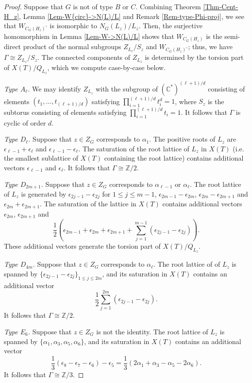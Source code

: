 \documentclass[11pt,oneside,dvipsnames]{amsart}
\theoremstyle{plain}
\theoremstyle{definition}
\theoremstyle{named}
\begin{document}
\begin{proof}
Suppose that $G$ is not of type $B$ or $C$. Combining Theorem \ref{Thm-Cent-H_z},  Lemma \ref{Lem-W{circ}->N(L)/L} and Remark \ref{Rem-type-Phi-proj}, we see that $W_{C_G(H_z)^{\circ}}$ is isomorphic to $N_G(L_z)/L_z$. Then, the surjective homomorphism in Lemma \ref{Lem-W->N(L)/L} shows that $W_{C_G(H_z)}$ is the semi-direct product of the normal subgroups $Z_{L_z}/S_z$ and $W_{C_G(H_z)^{\circ}}$; thus, we have $\Gamma\cong Z_{L_z}/S_z$. The connected components of $Z_{L_z}$ is determined by the torsion part of $X(T)/Q_{L_z}$, which we compute case-by-case below. 

\textit{Type $A_{\ell}$.} We may identify $Z_{L_z}$ with the subgroup of $(\mathbb{C}^{\ast})^{(\ell+1)/d}$ consisting of elements $(t_1,\ldots,t_{(\ell+1)/d})$ satisfying $\prod_{i=1}^{(\ell+1)/d}t_i^d=1$, where $S_z$ is the subtorus consisting of elements satisfying $\prod_{i=1}^{(\ell+1)/d}t_i=1$. It follows that $\Gamma$ is cyclic of order $d$.

\textit{Type $D_{\ell}$.} Suppose that $z\in Z_G$ corresponds to $\alpha_1$. The positive roots of $L_z$ are $\epsilon_{\ell-1}+\epsilon_{\ell}$ and $\epsilon_{\ell-1}-\epsilon_{\ell}$. The saturation of the root lattice of $L_z$ in $X(T)$ (i.e. the smallest sublattice of $X(T)$ containing the root lattice) contains additional vectors $\epsilon_{\ell-1}$ and $\epsilon_{\ell}$. It follows that $\Gamma\cong\mathbb{Z}/2$.

\textit{Type $D_{2m+1}$.} Suppose that $z\in Z_G$ corresponds to $\alpha_{\ell-1}$ or $\alpha_{\ell}$. The root lattice of $L_z$ is generated by $\epsilon_{2j-1}-\epsilon_{2j}$ for $1\le j\le m-1$, $\epsilon_{2m-1}-\epsilon_{2m}$, $\epsilon_{2m}-\epsilon_{2m+1}$ and $\epsilon_{2m}+\epsilon_{2m+1}$. The saturation of the lattice in $X(T)$ contains additional vectors $\epsilon_{2m}$, $\epsilon_{2m+1}$ and
$$
\frac{1}{2}(\epsilon_{2m-1}+\epsilon_{2m}+\epsilon_{2m+1}+\sum_{j=1}^{m-1}(\epsilon_{2j-1}-\epsilon_{2j})).
$$
These additional vectors generate the torsion part of $X(T)/Q_{L_z}$.

\textit{Type $D_{4m}$.} Suppose that $z\in Z_G$ corresponds to $\alpha_{\ell}$. The root lattice of of $L_z$ is spanned by $\{\epsilon_{2j-1}-\epsilon_{2j}\}_{1\le j\le 2m}$, and its saturation in $X(T)$ contains an additional vector
$$
\frac{1}{2}\sum_{j=1}^{2m}(\epsilon_{2j-1}-\epsilon_{2j}).
$$
It follows that $\Gamma\cong\mathbb{Z}/2$.

\textit{Type $E_6$.} Suppose that $z\in Z_G$ is not the identity. The root lattice of $L_z$ is spanned by $\{\alpha_1,\alpha_3,\alpha_5,\alpha_6\}$, and its saturation in $X(T)$ contains an additional vector
$$
\frac{1}{3}(\epsilon_8-\epsilon_7-\epsilon_6)-\epsilon_5=\frac{1}{3}(2\alpha_1+\alpha_3-\alpha_5-2\alpha_6).
$$
It follows that $\Gamma\cong\mathbb{Z}/3$.


\end{proof}
\end{document}
